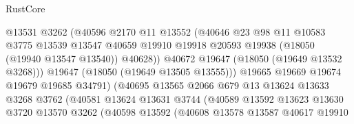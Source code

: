 \begin{lexlean}{RustCore}
\begin{coremodule}
                                    @13531
                                    @3262
                                    (@40596
                                      @2170
                                      @11
                                      @13552
                                      (@40646
                                        @23
                                        @98
                                        @11
                                        @10583
                                        @3775
                                        @13539
                                        @13547
                                        @40659
                                        @19910
                                        @19918
                                        @20593
                                        @19938
                                        (@18050 (@19940 @13547 @13540))
                                        @40628))
                                    @40672
                                    @19647
                                    (@18050 (@19649 @13532 @3268)))
                                  @19647
                                  (@18050 (@19649 @13505 @13555)))
                                @19665
                                @19669
                                @19674
                                @19679
                                @19685
                                @34791)
                              (@40695
                                @13565
                                @2066
                                @679
                                @13
                                @13624
                                @13633
                                @3268
                                @3762
                                (@40581
                                  @13624
                                  @13631
                                  @3744
                                  (@40589
                                    @13592
                                    @13623
                                    @13630
                                    @3720
                                    @13570
                                    @3262
                                    (@40598
                                      @13592
                                      (@40608
                                        @13578
                                        @13587
                                        @40617
                                        @19910

\end{coremodule}
\end{lexlean}
